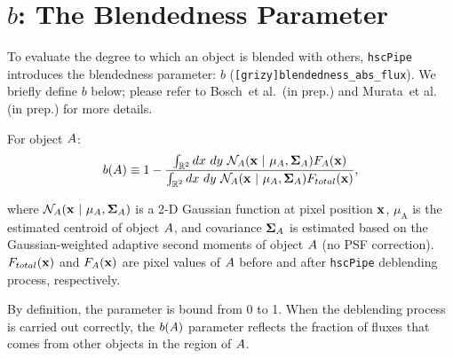 \documentclass[useamsfonts]{pasj01}
\def\etal{{\ et al.~}}
\def\hscpipe{\texttt{hscPipe}}
\begin{document}

\section{$b$: The Blendedness Parameter}
    \label{app:defineb}

    To evaluate the degree to which an object is blended with others, \hscpipe{} 
    introduces the blendedness parameter: $b$ (\texttt{[grizy]blendedness\_abs\_flux}).
    We briefly define  $b$ below; please refer to Bosch\etal (in prep.) and Murata\etal 
    (in prep.) for more details.

    For object ${\rm A}$:
    \begin{eqnarray*}
        b({\rm A}) \equiv
        1-\frac{\int_{\mathbb{R}^2} {\rm d}x~ {\rm d}y\ \mathcal{N}_{\mathrm{A}}({\bf x}\ |\  \mu_{\mathrm{A}}, {\bf\Sigma}_{\mathrm{A}})
        F_{\mathrm{A}}({\bf x})}{\int_{\mathbb{R}^2} {\rm d}x~ {\rm d}y\ \mathcal{N}_{\mathrm{A}}({\bf x}\ |\  \mu_{\mathrm{A}},
        {\bf\Sigma}_{\rm{A}}) F_{\rm{total}}({\bf x})},
        \label{eq:defineb}
    \end{eqnarray*}

    \noindent
    where $\mathcal{N}_{\rm{A}}({ \bf x }\ |\  \mu_{\rm{A}}, {\bf\Sigma}_{\rm{A}})$
    is a 2-D Gaussian function at pixel position $\bf x$, $\mu_{\mathrm{A}}$ is the
    estimated centroid of object ${\rm A}$, and covariance ${\bf \Sigma}_{\mathrm{A}}$
    is estimated based on the Gaussian-weighted adaptive second moments of object
    ${\rm A}$ (no PSF correction).
    $F_{\mathrm{total}}({\bf x })$ and $F_{\rm{A}}({\bf x })$ are pixel values of
    ${\rm A}$ before and after \hscpipe{} deblending process, respectively.

    By definition, the parameter is bound from 0 to 1.
    When the deblending process is carried out correctly, the $b({\rm A})$ parameter
    reflects the fraction of fluxes that comes from other objects in the
    region of ${\rm A}$.

%

\label{lastpage}
\end{document}
